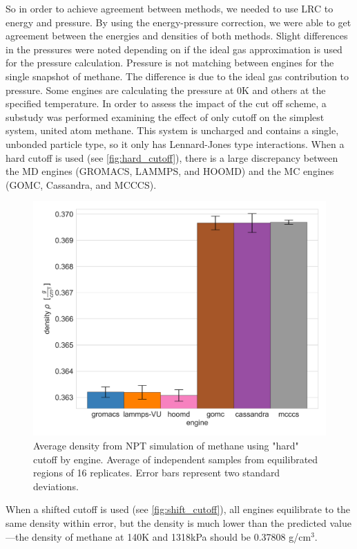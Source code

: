 So in order to achieve agreement between methods, we needed to use LRC to energy and pressure. 
By using the energy-pressure correction, we were able to get agreement between the energies and densities of both methods. 
Slight differences in the pressures were noted depending on if the ideal gas approximation is used for the pressure calculation.
Pressure is not matching between engines for the single snapshot of methane. 
The difference is due to the ideal gas contribution to pressure. 
Some engines are calculating the pressure at 0K and others at the specified temperature.
In order to assess the impact of the cut off scheme, a substudy was performed examining the effect of only cutoff on the simplest system, united atom methane. This system is uncharged and contains a single, unbonded particle type, so it only has Lennard-Jones type interactions. When a hard cutoff is used (see \autoref{fig:hard_cutoff}), there is a large discrepancy between the MD engines (GROMACS, LAMMPS, and HOOMD) and the MC engines (GOMC, Cassandra, and MCCCS). 
\begin{figure}[h!]
    \centering
    \includegraphics[width=0.8\linewidth,keepaspectratio]{figures/rep_study/hard_cutoff.png}
    \caption{Average density from NPT simulation of methane using "hard" cutoff by engine. Average of independent samples from equilibrated regions of 16 replicates. Error bars represent two standard deviations.}\label{fig:hard_cutoff}
\end{figure}
When a shifted cutoff is used (see \autoref{fig:shift_cutoff}), all engines equilibrate to the same density within error, but the density is much lower than the predicted value---the density of methane at 140K and 1318kPa should be 0.37808 g/cm$^3$\cite{NISTwebbook}.
